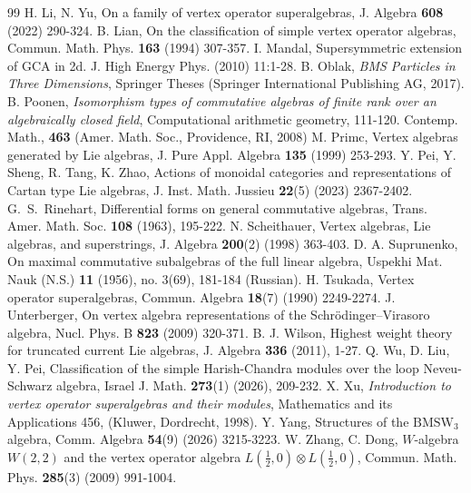 \documentclass[12pt]{article}
\numberwithin{equation}{section}
\theoremstyle{definition}
\theoremstyle{plain}
\begin{document}
\begin{thebibliography}{99}
H. Li, N. Yu, On a family of vertex operator superalgebras, J. Algebra \textbf{608} (2022) 290-324.
B. Lian, On the classification of simple vertex operator algebras, Commun. Math. Phys. \textbf{163} (1994) 307-357.
I. Mandal, Supersymmetric extension of GCA in 2d. J. High Energy Phys. (2010) 11:1-28.
B. Oblak, \textit{BMS Particles in Three Dimensions}, Springer Theses (Springer International Publishing AG, 2017).
B. Poonen, \textit{Isomorphism types of commutative algebras of finite rank over an algebraically closed field}, Computational arithmetic geometry, 111-120. Contemp. Math., \textbf{463} (Amer. Math. Soc., Providence, RI, 2008)
M. Primc, Vertex algebras generated by Lie algebras, J. Pure Appl. Algebra \textbf{135} (1999) 253-293.
Y. Pei, Y. Sheng, R. Tang, K. Zhao, Actions of monoidal categories and representations of Cartan type Lie algebras, J. Inst. Math. Jussieu \textbf{22}(5) (2023) 2367-2402.
G.~S.~Rinehart, Differential forms on general commutative algebras, Trans. Amer. Math. Soc. \textbf{108} (1963), 195-222.
N. Scheithauer, Vertex algebras, Lie algebras, and superstrings, J. Algebra \textbf{200}(2) (1998) 363-403.
D. A. Suprunenko, On maximal commutative subalgebras of the full linear algebra, Uspekhi Mat. Nauk (N.S.) \textbf{11} (1956), no. 3(69), 181-184 (Russian).
H. Tsukada, Vertex operator superalgebras, Commun. Algebra \textbf{18}(7) (1990) 2249-2274.
J. Unterberger, On vertex algebra representations of the Schr\"odinger--Virasoro algebra, Nucl. Phys. B \textbf{823} (2009) 320-371.
B. J. Wilson, Highest weight theory for truncated current Lie algebras, J. Algebra \textbf{336} (2011), 1-27.
Q. Wu, D. Liu, Y. Pei, Classification of the simple Harish-Chandra modules over the loop Neveu-Schwarz algebra, Israel J. Math. \textbf{273}(1) (2026), 209-232.
X. Xu, \textit{Introduction to vertex operator superalgebras and their modules}, Mathematics and its Applications 456, (Kluwer, Dordrecht, 1998).
Y. Yang, Structures of the $\mathrm{BMSW}_3$ algebra, Comm. Algebra \textbf{54}(9) (2026) 3215-3223.
W. Zhang, C. Dong, $W$-algebra $W(2,2)$ and the vertex operator algebra $L(\frac{1}{2},0)\otimes L(\frac{1}{2},0)$, Commun. Math. Phys. \textbf{285}(3) (2009) 991-1004.

\end{thebibliography}
\end{document}

